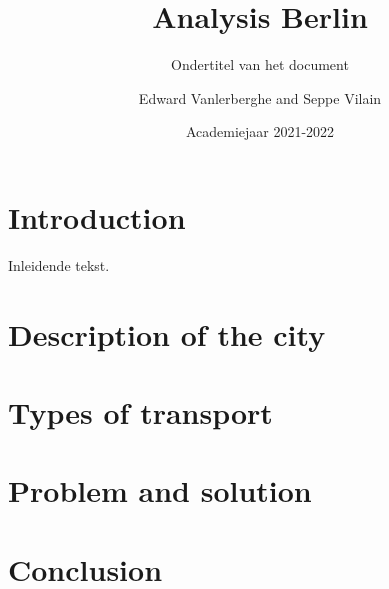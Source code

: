 \documentclass[a4paper,twoside,kul]{kulakreport} %
\title{Analysis Berlin}
\subtitle{Ondertitel van het document}
\author{Edward Vanlerberghe and Seppe Vilain}
\institute{KU Leuven}
\date{Academiejaar 2021-2022}
\begin{document}

\titlepage

\tableofcontents

\chapter*{Introduction}
Inleidende tekst.

\chapter{Description of the city}

\chapter{Types of transport}

	
	
\chapter{Problem and solution}



\chapter*{Conclusion}



\end{document}

